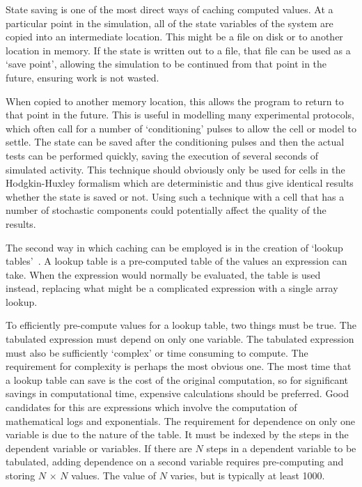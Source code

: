 State saving is one of the most direct ways of caching computed values.  At a
particular point in the simulation, all of the state variables of the
system are copied into an intermediate location.  This might be a file on disk or
to another location in memory.  If the state is written out to a file, that file can
be used as a `save point', allowing the simulation to be continued from that
point in the future, ensuring work is not wasted.

When copied to another memory location, this allows the program to return to
that point in the future.  This is useful in modelling many experimental
protocols, which often call for a number of `conditioning' pulses to allow the
cell or model to settle.  The state can be saved after the conditioning pulses
and then the actual tests can be performed quickly, saving the execution of
several seconds of simulated activity.  This technique should obviously only be
used for cells in the Hodgkin-Huxley formalism which are deterministic and thus
give identical results whether the state is saved or not.  Using such a
technique with a cell that has a number of stochastic components could
potentially affect the quality of the results.

The second way in which caching can be employed is in the creation of `lookup
tables'~\cite{Victorri1985,Cooper2006}.
A lookup table is a pre-computed table of the values an expression can
take.
When the expression would normally be evaluated, the table is used
instead, replacing what might be a complicated expression with a single array
lookup.

To efficiently pre-compute values for a lookup table, two things must be true.
The tabulated expression must depend on only one variable.
The tabulated expression must also be sufficiently `complex' or time consuming
to compute.
The requirement for complexity is perhaps the most obvious one.
The most time that a lookup table can save is the cost of the original
computation, so for significant savings in computational time, expensive
calculations should be preferred.
Good candidates for this are expressions which involve the computation of
mathematical logs and exponentials.
The requirement for dependence on only one variable is due to the nature of the
table.
It must be indexed by the steps in the dependent variable or variables.
If there are $N$ steps in a dependent variable to be tabulated, adding
dependence on a second variable requires pre-computing and storing
$N\,\times\,N$ values.
The value of $N$ varies, but is typically at least 1000.

